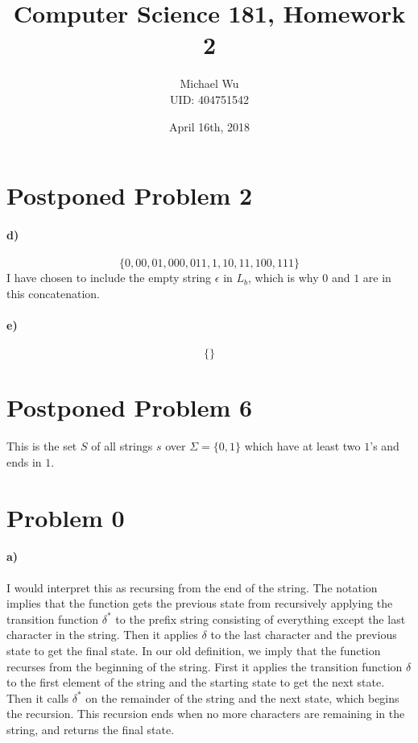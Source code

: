 \documentclass[12pt]{article}
\begin{document}
\title{Computer Science 181, Homework 2}
\date{April 16th, 2018}
\author{Michael Wu\\UID: 404751542}
\maketitle

\section*{Postponed Problem 2}

\paragraph{d)}

\[\{0,00,01,000,011,1,10,11,100,111\}\]
I have chosen to include the empty string \(\epsilon\) in \(L_b\), which is why \(0\) and \(1\) are in this concatenation.

\paragraph{e)}

\[\{\}\]

\section*{Postponed Problem 6}

This is the set \(S\) of all strings \(s\) over \(\Sigma=\{0,1\}\) which have at least two \(1\)'s and ends in \(1\).

\section*{Problem 0}

\paragraph{a)}

I would interpret this as recursing from the end of the string. The notation implies that the function gets the previous state
from recursively applying the transition function \(\delta^*\) to the prefix string consisting of everything except the last character in the string.
Then it applies \(\delta\) to the last character and the previous state to get the final state. In our old definition, we imply that the function recurses
from the beginning of the string. First it applies the transition function \(\delta\) to the first element of the string and the starting state to get the
next state. Then it calls \(\delta^*\) on the remainder of the string and the next state, which begins the recursion. This recursion ends when no more characters
are remaining in the string, and returns the final state.
\end{document}
